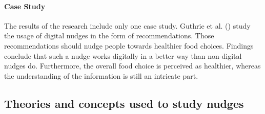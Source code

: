 \paragraph{Case Study}
The results of the research include only one case study. Guthrie et al. (\citeyear{guthrie_nudging_2015}) study the usage of digital nudges in the form of recommendations. Those recommendations should nudge people towards healthier food choices. Findings conclude that such a nudge works digitally in a better way than non-digital nudges do. Furthermore, the overall food choice is perceived as healthier, whereas the understanding of the information is still an intricate part.




\subsection{Theories and concepts used to study nudges}

